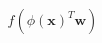 \documentclass[preview]{standalone}
\begin{document}
\begin{align*}
f(\phi(\mathbf{x})^T\mathbf{w})
\end{align*}
\end{document}

